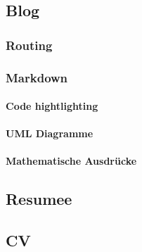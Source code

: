 \subsection{ Blog } 
\subsubsection{ Routing }
\subsubsection{ Markdown }
\paragraph{ Code hightlighting }
\paragraph{ UML Diagramme}
\paragraph{ Mathematische Ausdrücke }
\subsection{ Resumee } 
\subsection{ CV } 


